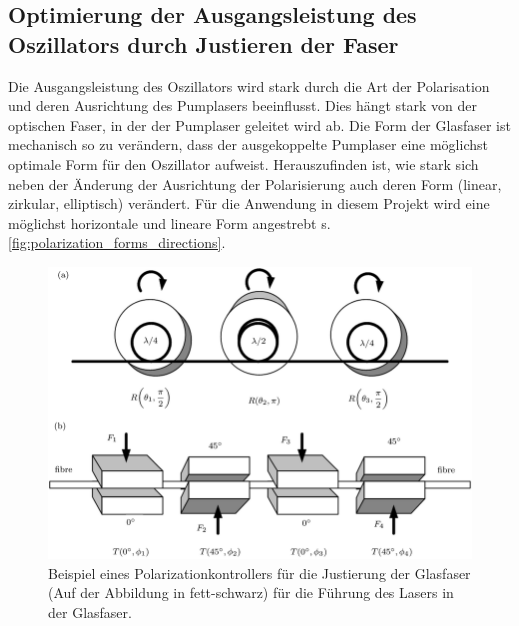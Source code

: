 \subsection{Optimierung der Ausgangsleistung des Oszillators durch Justieren der Faser}
Die Ausgangsleistung des Oszillators wird stark durch die Art der Polarisation und deren Ausrichtung des Pumplasers beeinflusst. Dies hängt stark von der optischen Faser, in der der Pumplaser geleitet wird ab. Die Form der Glasfaser ist mechanisch so zu verändern, dass der ausgekoppelte Pumplaser eine möglichst optimale Form für den Oszillator aufweist. Herauszufinden ist, wie stark sich neben der Änderung der Ausrichtung der Polarisierung auch deren Form (linear, zirkular, elliptisch) verändert. Für die Anwendung in diesem Projekt wird eine möglichst horizontale und lineare Form angestrebt s. \ref{fig:polarization_forms_directions}.\\

\begin{figure}[H]
    \centering
    \includegraphics[scale=0.4, trim={15mm 125mm 0 0},clip]{98_images/laser_plarizationcontroller.png}
    \caption{Beispiel eines Polarizationkontrollers für die Justierung der Glasfaser (Auf der Abbildung in fett-schwarz) für die Führung des Lasers in der Glasfaser.}
    \label{fig:polarizationcontroller}
\end{figure}

